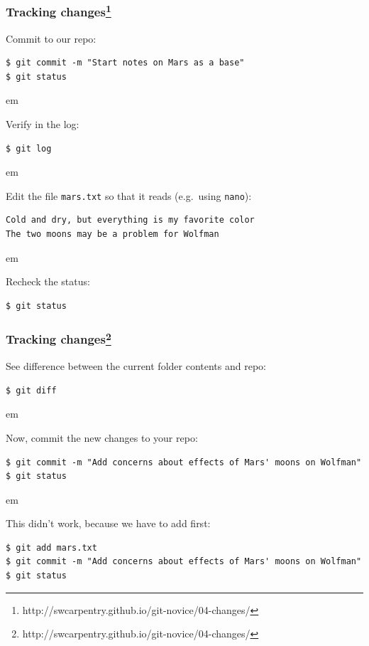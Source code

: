\documentclass{beamer}
\begin{document}
\begin{frame}[fragile]
  \frametitle{Tracking changes\footnote{http://swcarpentry.github.io/git-novice/04-changes/}}

  Commit to our repo:
  \begin{verbatim}
$ git commit -m "Start notes on Mars as a base"
$ git status
  \end{verbatim}

  \pause
   em

Verify in the log:
\begin{verbatim}
$ git log
\end{verbatim}

 em

\pause

Edit the file \texttt{mars.txt} so that it reads (e.g.~using \texttt{nano}):
\begin{verbatim}
Cold and dry, but everything is my favorite color
The two moons may be a problem for Wolfman
\end{verbatim}
\pause

 em

Recheck the status:
\begin{verbatim}
$ git status
\end{verbatim}

\end{frame}

\begin{frame}[fragile]
  \frametitle{Tracking changes\footnote{http://swcarpentry.github.io/git-novice/04-changes/}}

See difference between the current folder contents and repo:
\begin{verbatim}
$ git diff
\end{verbatim}
 em
\pause

Now, commit the new changes to your repo:

\begin{verbatim}
$ git commit -m "Add concerns about effects of Mars' moons on Wolfman"
$ git status
\end{verbatim}

 em
\pause

\textcolor{red!50!black}{This didn't work, because we have to add first:}
\begin{verbatim}
$ git add mars.txt
$ git commit -m "Add concerns about effects of Mars' moons on Wolfman"
$ git status
\end{verbatim}


\end{frame}
\end{document}
